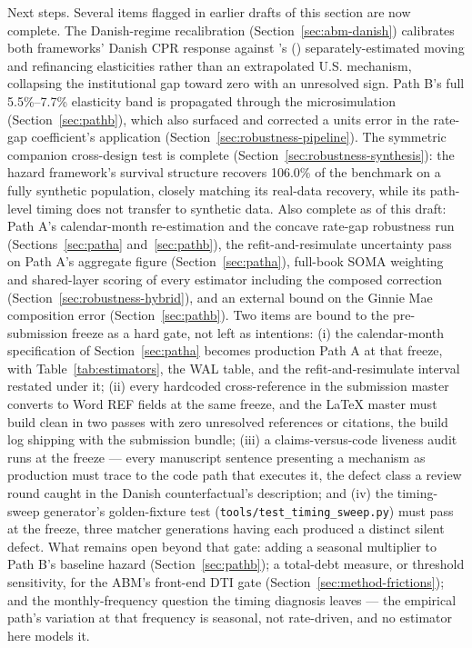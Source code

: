 \documentclass[12pt]{article}
\newcommand{\citepos}[1]{\citeauthor{#1}'s (\citeyear{#1})}
\begin{document}
Next steps. Several items flagged in earlier drafts of this section are now complete. The Danish-regime recalibration (Section~\ref{sec:abm-danish}) calibrates both frameworks' Danish CPR response against \citepos{berger2026} separately-estimated moving and refinancing elasticities rather than an extrapolated U.S. mechanism, collapsing the institutional gap toward zero with an unresolved sign. Path B's full 5.5\%--7.7\% elasticity band is propagated through the microsimulation (Section~\ref{sec:pathb}), which also surfaced and corrected a units error in the rate-gap coefficient's application (Section~\ref{sec:robustness-pipeline}). The symmetric companion cross-design test is complete (Section~\ref{sec:robustness-synthesis}): the hazard framework's survival structure recovers 106.0\% of the benchmark on a fully synthetic population, closely matching its real-data recovery, while its path-level timing does not transfer to synthetic data. Also complete as of this draft: Path A's calendar-month re-estimation and the concave rate-gap robustness run (Sections~\ref{sec:patha} and~\ref{sec:pathb}), the refit-and-resimulate uncertainty pass on Path A's aggregate figure (Section~\ref{sec:patha}), full-book SOMA weighting and shared-layer scoring of every estimator including the composed correction (Section~\ref{sec:robustness-hybrid}), and an external bound on the Ginnie Mae composition error (Section~\ref{sec:pathb}). Two items are bound to the pre-submission freeze as a hard gate, not left as intentions: (i) the calendar-month specification of Section~\ref{sec:patha} becomes production Path A at that freeze, with Table~\ref{tab:estimators}, the WAL table, and the refit-and-resimulate interval restated under it; (ii) every hardcoded cross-reference in the submission master converts to Word REF fields at the same freeze, and the LaTeX master must build clean in two passes with zero unresolved references or citations, the build log shipping with the submission bundle; (iii) a claims-versus-code liveness audit runs at the freeze --- every manuscript sentence presenting a mechanism as production must trace to the code path that executes it, the defect class a review round caught in the Danish counterfactual's description; and (iv) the timing-sweep generator's golden-fixture test (\texttt{tools/test\_timing\_sweep.py}) must pass at the freeze, three matcher generations having each produced a distinct silent defect. What remains open beyond that gate: adding a seasonal multiplier to Path B's baseline hazard (Section~\ref{sec:pathb}); a total-debt measure, or threshold sensitivity, for the ABM's front-end DTI gate (Section~\ref{sec:method-frictions}); and the monthly-frequency question the timing diagnosis leaves --- the empirical path's variation at that frequency is seasonal, not rate-driven, and no estimator here models it.
\end{document}
